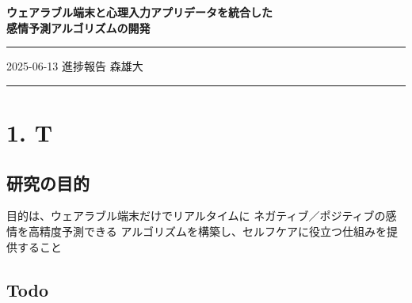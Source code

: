 \documentclass[a4paper,11pt]{article}
\begin{document}
\begin{center}
  {\LARGE \bfseries ウェアラブル端末と心理入力アプリデータを統合した\\感情予測アルゴリズムの開発}\\[6ex]
\end{center}

\hrule\vspace{1ex}
{\normalsize 2025-06-13 進捗報告 \hfill 森雄大}\\
\hrule\vspace{5ex}

\section*{1. T}
\subsection*{研究の目的}
目的は、ウェアラブル端末だけでリアルタイムに  
ネガティブ／ポジティブの感情を高精度予測できる  
アルゴリズムを構築し、セルフケアに役立つ仕組みを提供すること

\subsection*{Todo}
\end{document}
